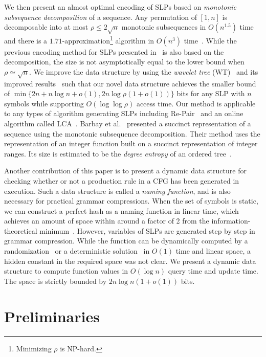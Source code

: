 \documentclass[10pt]{llncs}
\begin{document}
We then present an almost optimal encoding of SLPs based on
{\em monotonic subsequence decomposition} of a sequence.
Any permutation of $[1,n]$ is decomposable into at most $\rho \leq 2\sqrt{n}$
monotonic subsequences in $O(n^{1.5})$ time~\cite{Yehuda1998} and
there is a $1.71$-approximation\footnote{Minimizing $\rho$ is NP-hard.} 
algorithm in $O(n^3)$ time~\cite{Fomin2002}. 
While the previous encoding method for SLPs presented in~\cite{Takabatake2012} 
is also based on the decomposition, the size is not asymptotically equal
to the lower bound when $\rho \simeq \sqrt{n}$.
We improve the data structure by using the {\em wavelet tree} (WT)~\cite{Grossi03} and its improved results~\cite{Jeremy2010,Golynski2006} such that
our novel data structure achieves the smaller bound of $\min\{2n+n\log n +o(1),2n\log\rho(1+o(1))\}$ 
bits for any SLP with $n$ symbols while supporting $O(\log\log\rho)$ access time.
Our method is applicable to any types of algorithm generating SLPs
including Re-Pair~\cite{Larsson00} and an online algorithm called LCA~\cite{Maruyama2012}.
Barbay et al.~\cite{Barbay2009} presented a succinct representation of a sequence using the monotonic subsequence decomposition. 
Their method uses the representation of an integer function built on a succinct representation of integer ranges. 
Its size is estimated to be the {\em degree entropy} of an ordered tree~\cite{Jansson2012-JCSS}.

Another contribution of this paper is to present a dynamic data structure for checking whether or not a production rule in a CFG has been generated in execution. 
Such a data structure is called a {\em naming function}, and is also necessary for practical grammar compressions. 
When the set of symbols is static, we can construct a perfect hash as a naming function in linear time, which achieves 
an amount of space within around a factor of 2 from the information-theoretical minimum~\cite{Botelho2007}.
However, variables of SLPs are generated step by step in grammar compression.
While the function can be dynamically computed by a randomization~\cite{Karp87} or
a deterministic solution~\cite{Karp72} in $O(1)$ time and linear space,
a hidden constant in the required space was not clear.
We present a dynamic data structure to compute function values in $O(\log n)$ query time
and update time. The space is strictly bounded by $2n\log n(1+o(1))$ bits.

\section{Preliminaries}
\end{document}
